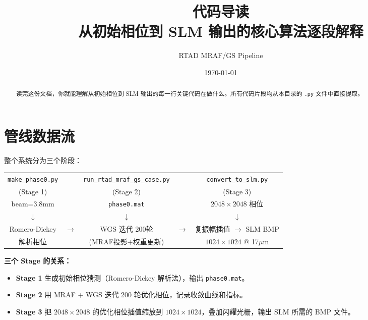\documentclass[11pt,a4paper]{ctexart}
\title{\textbf{代码导读\\[0.3em]\large 从初始相位到 SLM 输出的核心算法逐段解释}}
\author{RTAD MRAF/GS Pipeline}
\date{\today}
\begin{document}
\maketitle
\thispagestyle{fancy}

\vspace{1em}

\begin{abstract}
\noindent 读完这份文档，你就能理解从初始相位到 SLM 输出的每一行关键代码在做什么。所有代码片段均从本目录的 \texttt{.py} 文件中直接提取。
\end{abstract}

\tableofcontents
\newpage

\section{管线数据流}

整个系统分为三个阶段：

\begin{center}
\begin{tabular}{ccccc}
\texttt{make\_phase0.py} & & \texttt{run\_rtad\_mraf\_gs\_case.py} & & \texttt{convert\_to\_slm.py} \\
(Stage 1) & & (Stage 2) & & (Stage 3) \\[4pt]
beam=3.8mm & & \texttt{phase0.mat} & & $2048\times2048$ 相位 \\
$\downarrow$ & & $\downarrow$ & & $\downarrow$ \\
Romero-Dickey & $\longrightarrow$ & WGS 迭代 200轮 & $\longrightarrow$ & 复振幅插值 $\rightarrow$ SLM BMP \\
解析相位 & & (MRAF投影+权重更新) & & $1024\times1024$ @ 17$\mu$m \\
\end{tabular}
\end{center}

\vspace{1em}
\textbf{三个 Stage 的关系：}
\begin{itemize}[nosep]
  \item \textbf{Stage 1} 生成初始相位猜测（Romero-Dickey 解析法），输出 \texttt{phase0.mat}。
  \item \textbf{Stage 2} 用 MRAF + WGS 迭代 200 轮优化相位，记录收敛曲线和指标。
  \item \textbf{Stage 3} 把 $2048\times2048$ 的优化相位插值缩放到 $1024\times1024$，叠加闪耀光栅，输出 SLM 所需的 BMP 文件。
\end{itemize}
\end{document}
